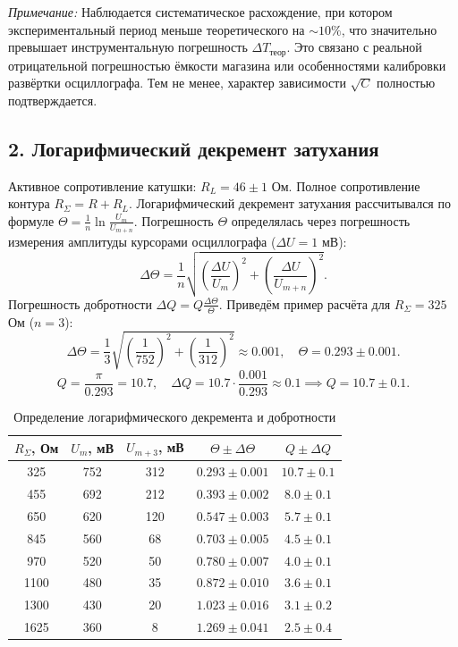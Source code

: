 \documentclass[a4paper,12pt]{extarticle}
\begin{document}
\textit{Примечание:} Наблюдается систематическое расхождение, при котором экспериментальный период меньше теоретического на $\sim 10\%$, что значительно превышает инструментальную погрешность $\Delta T_{\text{теор}}$. Это связано с реальной отрицательной погрешностью ёмкости магазина или особенностями калибровки развёртки осциллографа. Тем не менее, характер зависимости $\sqrt{C}$ полностью подтверждается.

\subsection*{2. Логарифмический декремент затухания}
Активное сопротивление катушки: $R_L = 46 \pm 1$ Ом. Полное сопротивление контура $R_\Sigma = R + R_L$.
Логарифмический декремент затухания рассчитывался по формуле $\Theta = \frac{1}{n} \ln \frac{U_m}{U_{m+n}}$. 
Погрешность $\Theta$ определялась через погрешность измерения амплитуды курсорами осциллографа ($\Delta U = 1$ мВ):
\begin{equation*}
    \Delta \Theta = \frac{1}{n} \sqrt{\left(\frac{\Delta U}{U_m}\right)^2 + \left(\frac{\Delta U}{U_{m+n}}\right)^2}.
\end{equation*}
Погрешность добротности $\Delta Q = Q \frac{\Delta \Theta}{\Theta}$. Приведём пример расчёта для $R_\Sigma = 325$ Ом ($n=3$):
\begin{equation*}
    \Delta \Theta = \frac{1}{3} \sqrt{\left(\frac{1}{752}\right)^2 + \left(\frac{1}{312}\right)^2} \approx 0.001, \quad \Theta = 0.293 \pm 0.001.
\end{equation*}
\begin{equation*}
    Q = \frac{\pi}{0.293} = 10.7, \quad \Delta Q = 10.7 \cdot \frac{0.001}{0.293} \approx 0.1 \implies Q = 10.7 \pm 0.1.
\end{equation*}

\begin{table}[H]
    \centering
    \caption{Определение логарифмического декремента и добротности}
    \label{tab:damping}
    \begin{tabular}{ccccc}
        \toprule
        $R_\Sigma$, Ом & $U_m$, мВ & $U_{m+3}$, мВ & $\Theta \pm \Delta\Theta$ & $Q \pm \Delta Q$ \\
        \midrule
        325  & 752 & 312 & $0.293 \pm 0.001$ & $10.7 \pm 0.1$ \\
        455  & 692 & 212 & $0.393 \pm 0.002$ & $8.0 \pm 0.1$ \\
        650  & 620 & 120 & $0.547 \pm 0.003$ & $5.7 \pm 0.1$ \\
        845  & 560 & 68  & $0.703 \pm 0.005$ & $4.5 \pm 0.1$ \\
        970  & 520 & 50  & $0.780 \pm 0.007$ & $4.0 \pm 0.1$ \\
        1100 & 480 & 35  & $0.872 \pm 0.010$ & $3.6 \pm 0.1$ \\
        1300 & 430 & 20  & $1.023 \pm 0.016$ & $3.1 \pm 0.2$ \\
        1625 & 360 & 8   & $1.269 \pm 0.041$ & $2.5 \pm 0.4$ \\
        \bottomrule
    \end{tabular}
\end{table}
\end{document}

